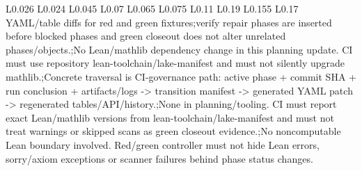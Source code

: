 \begin{longtable}{L{0.026\linewidth} L{0.024\linewidth} L{0.045\linewidth} L{0.07\linewidth} L{0.065\linewidth} L{0.075\linewidth} L{0.11\linewidth} L{0.19\linewidth} L{0.155\linewidth} L{0.17\linewidth}}
YAML/\allowbreak{}table diffs for red and green fixtures;\newline verify repair phases are inserted before blocked phases and green closeout does not alter unrelated phases/\allowbreak{}objects.;\newline No Lean/\allowbreak{}mathlib dependency change in this planning update. CI must use repository lean-toolchain/\allowbreak{}lake-manifest and must not silently upgrade mathlib.;\newline Concrete traversal is CI-governance path: active phase + commit SHA + run conclusion + artifacts/\allowbreak{}logs -> transition manifest -> generated YAML patch -> regenerated tables/\allowbreak{}API/\allowbreak{}history.;\newline None in planning/\allowbreak{}tooling. CI must report exact Lean/\allowbreak{}mathlib versions from lean-toolchain/\allowbreak{}lake-manifest and must not treat warnings or skipped scans as green closeout evidence.;\newline No noncomputable Lean boundary involved. Red/\allowbreak{}green controller must not hide Lean errors, sorry/\allowbreak{}axiom exceptions or scanner failures behind phase status changes.\\
\hline
\addlinespace[0.24em]

\end{longtable}
